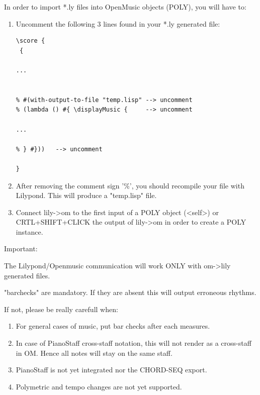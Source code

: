 \documentclass{article}
\begin{document}
In order to import *.ly files into OpenMusic objects (POLY), you will have to:\\
\begin{enumerate}
\item Uncomment the following 3 lines found in your *.ly generated file:\\

\begin{tcolorbox}
  
\begin{verbatim}
\score { 
 { 

...


% #(with-output-to-file "temp.lisp" --> uncomment
% (lambda () #{ \displayMusic {     --> uncomment

...

% } #}))   --> uncomment

} 
\end{verbatim}    

\end{tcolorbox}  
\vskip 5pt

\item After removing the comment sign '\%', you should recompile your file with Lilypond. This will produce a "temp.lisp" file.\\

\item Connect lily->om to the first input of a POLY object (<self>) or CRTL+SHIFT+CLICK the output of lily->om in order to create a POLY instance.\\

\end{enumerate}

Important:

The Lilypond/Openmusic communication will work ONLY with om->lily generated files. 

"barchecks" are mandatory. If they are absent this will output erroneous rhythms.

If not, please be really carefull when:\\

\begin{enumerate}

\item For general cases of music, put bar checks after each measures.\\

\item In case of PianoStaff cross-staff notation, this will not render as a cross-staff in OM. Hence all notes will stay on the same staff.

\item PianoStaff is not yet integrated nor the CHORD-SEQ export.

\item Polymetric and tempo changes are not yet supported.

\end{enumerate}
\end{document}

